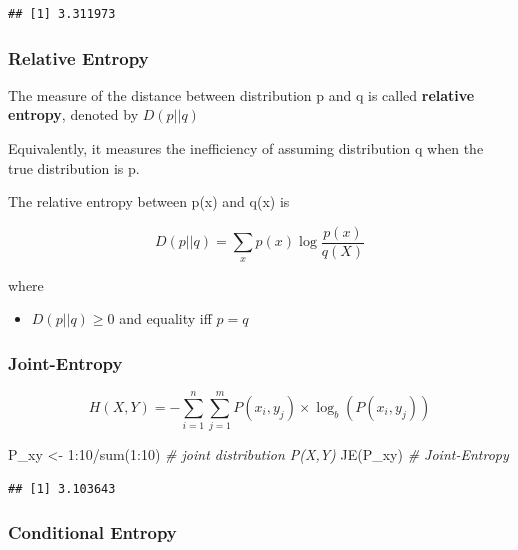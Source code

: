 \documentclass[
]{book}
\newenvironment{Shaded}{\begin{snugshade}}{\end{snugshade}}
\newcommand{\CommentTok}[1]{\textcolor[rgb]{0.56,0.35,0.01}{\textit{#1}}}
\newcommand{\DecValTok}[1]{\textcolor[rgb]{0.00,0.00,0.81}{#1}}
\newcommand{\FunctionTok}[1]{\textcolor[rgb]{0.00,0.00,0.00}{#1}}
\newcommand{\NormalTok}[1]{#1}
\newcommand{\OtherTok}[1]{\textcolor[rgb]{0.56,0.35,0.01}{#1}}
\newcommand{\SpecialCharTok}[1]{\textcolor[rgb]{0.00,0.00,0.00}{#1}}
\providecommand{\tightlist}{%
  \setlength{\itemsep}{0pt}\setlength{\parskip}{0pt}}
\begin{document}
\begin{verbatim}
## [1] 3.311973
\end{verbatim}

\hypertarget{relative-entropy}{%
\subsubsection{Relative Entropy}\label{relative-entropy}}

The measure of the distance between distribution p and q is called \textbf{relative entropy}, denoted by \(D(p ||q)\)

Equivalently, it measures the inefficiency of assuming distribution q when the true distribution is p.

The relative entropy between p(x) and q(x) is

\[
D(p||q) = \sum_x p(x) \log \frac{p(x)}{q(X)}
\]

where

\begin{itemize}
\tightlist
\item
  \(D(p||q) \ge 0\) and equality iff \(p = q\)
\end{itemize}

\hypertarget{joint-entropy}{%
\subsubsection{Joint-Entropy}\label{joint-entropy}}

\[
H(X,Y) = - \sum_{i=1}^n \sum_{j = 1}^m P(x_i, y_j) \times \log_b(P(x_i,y_j))
\]

\begin{Shaded}
\begin{Highlighting}[]
\NormalTok{P\_xy }\OtherTok{\textless{}{-}} \DecValTok{1}\SpecialCharTok{:}\DecValTok{10}\SpecialCharTok{/}\FunctionTok{sum}\NormalTok{(}\DecValTok{1}\SpecialCharTok{:}\DecValTok{10}\NormalTok{) }\CommentTok{\# joint distribution P(X,Y)}
\FunctionTok{JE}\NormalTok{(P\_xy) }\CommentTok{\# Joint{-}Entropy}
\end{Highlighting}
\end{Shaded}

\begin{verbatim}
## [1] 3.103643
\end{verbatim}

\hypertarget{conditional-entropy}{%
\subsubsection{Conditional Entropy}\label{conditional-entropy}}
\end{document}
